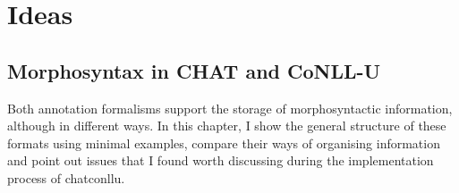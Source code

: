 \chapter{Ideas} %

\label{Chapter8} %

\section{Morphosyntax in CHAT and CoNLL-U}

Both annotation formalisms support the storage of morphosyntactic information, although in different ways. In this chapter, I show the general structure of these formats using minimal examples, compare their ways of organising information and point out issues that I found worth discussing during the implementation process of chatconllu.


